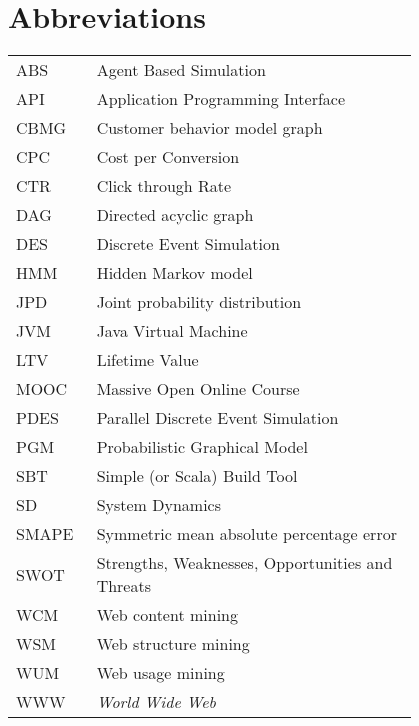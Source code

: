\chapter*{Abbreviations}

\begin{flushleft}
\begin{tabular}{l p{0.8\linewidth}}
ABS      & Agent Based Simulation\\
API      & Application Programming Interface\\
CBMG     & Customer behavior model graph\\
CPC      & Cost per Conversion\\
CTR      & Click through Rate\\
DAG      & Directed acyclic graph\\
DES      & Discrete Event Simulation\\
HMM      & Hidden Markov model\\
JPD      & Joint probability distribution\\
JVM      & Java Virtual Machine\\
LTV      & Lifetime Value\\
MOOC     & Massive Open Online Course\\
PDES     & Parallel Discrete Event Simulation\\
PGM      & Probabilistic Graphical Model\\
SBT      & Simple (or Scala) Build Tool\\
SD       & System Dynamics\\
SMAPE    & Symmetric mean absolute percentage error\\
SWOT     & Strengths, Weaknesses, Opportunities and Threats\\
WCM      & Web content mining\\
WSM      & Web structure mining\\
WUM      & Web usage mining\\
WWW      & \emph{World Wide Web}
\end{tabular}
\end{flushleft}
